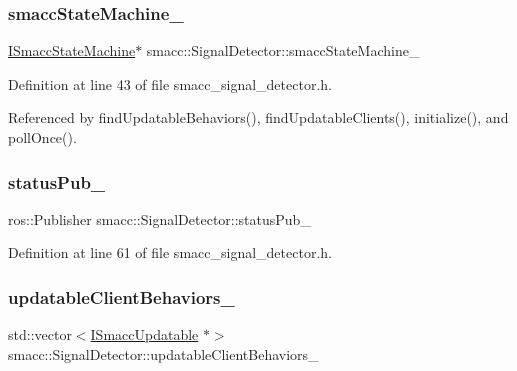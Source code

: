 \subsubsection{\texorpdfstring{smacc\+State\+Machine\+\_\+}{smaccStateMachine\_}}
{\footnotesize\ttfamily \hyperlink{classsmacc_1_1ISmaccStateMachine}{I\+Smacc\+State\+Machine}$\ast$ smacc\+::\+Signal\+Detector\+::smacc\+State\+Machine\+\_\+\hspace{0.3cm}{\ttfamily [private]}}



Definition at line 43 of file smacc\+\_\+signal\+\_\+detector.\+h.



Referenced by find\+Updatable\+Behaviors(), find\+Updatable\+Clients(), initialize(), and poll\+Once().

\mbox{\label{classsmacc_1_1SignalDetector_ae065bbd4e699e5fce00fbc508dedd4c1}} 
\subsubsection{\texorpdfstring{status\+Pub\+\_\+}{statusPub\_}}
{\footnotesize\ttfamily ros\+::\+Publisher smacc\+::\+Signal\+Detector\+::status\+Pub\+\_\+\hspace{0.3cm}{\ttfamily [private]}}



Definition at line 61 of file smacc\+\_\+signal\+\_\+detector.\+h.

\mbox{\label{classsmacc_1_1SignalDetector_a9dce129da8c8a9971416a8f498132c23}} 
\subsubsection{\texorpdfstring{updatable\+Client\+Behaviors\+\_\+}{updatableClientBehaviors\_}}
{\footnotesize\ttfamily std\+::vector$<$\hyperlink{classsmacc_1_1ISmaccUpdatable}{I\+Smacc\+Updatable} $\ast$$>$ smacc\+::\+Signal\+Detector\+::updatable\+Client\+Behaviors\+\_\+\hspace{0.3cm}{\ttfamily [private]}}



